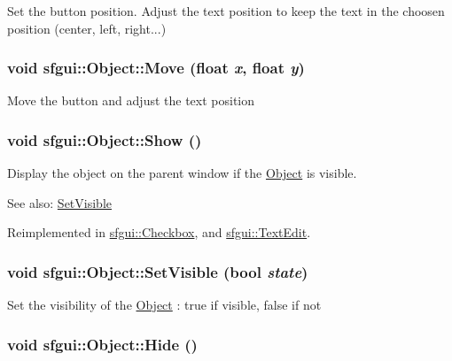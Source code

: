 Set the button position. Adjust the text position to keep the text in the choosen position (center, left, right...) \hypertarget{classsfgui_1_1Object_70b15fba99da515808d3da7d8042f458}{
\subsubsection[Move]{\setlength{\rightskip}{0pt plus 5cm}void sfgui::Object::Move (float {\em x}, \/  float {\em y})}}
\label{classsfgui_1_1Object_70b15fba99da515808d3da7d8042f458}




Move the button and adjust the text position \hypertarget{classsfgui_1_1Object_cdf7f9b5f731e49e0e13e55de704805d}{
\subsubsection[Show]{\setlength{\rightskip}{0pt plus 5cm}void sfgui::Object::Show ()}}
\label{classsfgui_1_1Object_cdf7f9b5f731e49e0e13e55de704805d}




Display the object on the parent window if the \hyperlink{classsfgui_1_1Object}{Object} is visible. \begin{Desc}
\item[See also:]\hyperlink{classsfgui_1_1Object_c5d4f50f3d8712f098915cee5fc4ad41}{SetVisible} \end{Desc}


Reimplemented in \hyperlink{classsfgui_1_1Checkbox_0028c58d4579845c1bdf3cae7ec9af5a}{sfgui::Checkbox}, and \hyperlink{classsfgui_1_1TextEdit_1ee03247816213b34caaff365b160de0}{sfgui::TextEdit}.\hypertarget{classsfgui_1_1Object_c5d4f50f3d8712f098915cee5fc4ad41}{
\subsubsection[SetVisible]{\setlength{\rightskip}{0pt plus 5cm}void sfgui::Object::SetVisible (bool {\em state})}}
\label{classsfgui_1_1Object_c5d4f50f3d8712f098915cee5fc4ad41}




Set the visibility of the \hyperlink{classsfgui_1_1Object}{Object} : true if visible, false if not \hypertarget{classsfgui_1_1Object_e4711d5359ca3b756c9d4e063890cf16}{
\subsubsection[Hide]{\setlength{\rightskip}{0pt plus 5cm}void sfgui::Object::Hide ()}}
\label{classsfgui_1_1Object_e4711d5359ca3b756c9d4e063890cf16}


